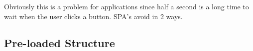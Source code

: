 \documentclass{article}[10pt]
\begin{document}
Obviously this is a problem for applications since half a second is a long time to wait when the user clicks a button. SPA's avoid in 2 ways.

\subsection{Pre-loaded Structure}




\end{document}
